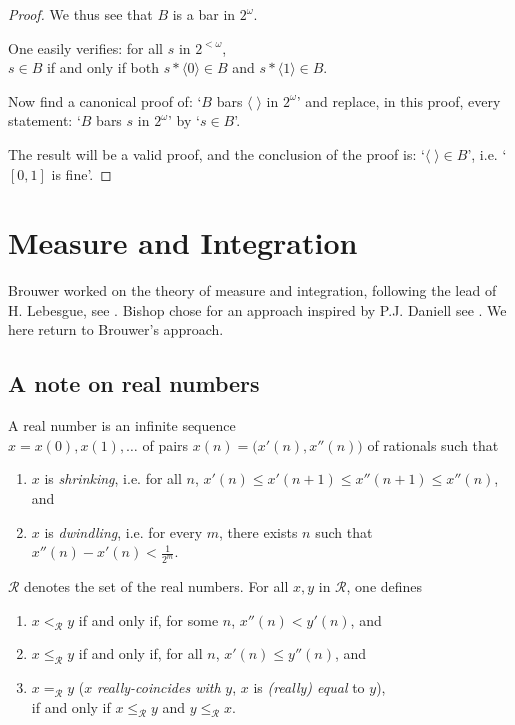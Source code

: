 \documentclass[a4paper]{amsart}
\theoremstyle{plain}
\begin{document}
\begin{proof}
We thus see that $B$ is a bar in $2^\omega$.

\smallskip

One easily verifies:  for all $s$ in $2^{<\omega}$, \\$s\in B$ if and only if both $s\ast\langle 0\rangle \in B$ and $s\ast\langle 1 \rangle \in B$.

Now find a canonical proof of: `$B$ bars $\langle\;\rangle$ in $2^\omega$' and replace, in this proof, every statement: `$B$  bars $s$ in $2^\omega$' by `$s \in B$'. 

The result will be a valid proof, and the conclusion of the proof is: `$\langle \;\rangle \in B$', i.e. `$[0,1]$ is fine'.
\end{proof}


 \section{Measure and Integration}\label{S:measure}
 
 Brouwer worked on the theory of measure and integration, following the lead of H. Lebesgue, see \cite[Chapter VI]{heyting56}. Bishop chose for an approach inspired by P.J. Daniell see \cite[Chapter 6]{bishopbridges85}.  We here return to Brouwer's approach.
 
 \subsection{A note on real numbers}\label{SS:reals} A real number  is an infinite sequence \\$x=x(0), x(1), \ldots$ of pairs $x(n)=\bigl(x'(n), x''(n)\bigr)$ of  rationals such that \begin{enumerate} \item $x$ is \emph{shrinking}, i.e. for all $n$, $x'(n)\le x'(n+1)\le x''(n+1)\le x''(n)$, and \item $x$ is \emph{dwindling}, i.e. for every $m$, there exists $n$ such that $x''(n)-x'(n)<\frac{1}{2^m}$. \end{enumerate}
 
 $\mathcal{R}$ denotes the set of the real numbers. For all $x,y$ in $\mathcal{R}$, one defines \begin{enumerate} \item $x<_\mathcal{R} y$ if and only if, for some $n$, $x''(n)<y'(n)$, and \item $x\le_\mathcal{R} y$ if and only if, for all $n$, $x'(n)\le y''(n)$, and \item $x=_\mathcal{R}y$ ($x$ \emph{really-coincides with} $y$, $x$ is \emph{(really) equal} to $y$), \\if and only if $x\le_\mathcal{R} y$ and $y\le_\mathcal{R} x$. \end{enumerate}
 
\end{document}

